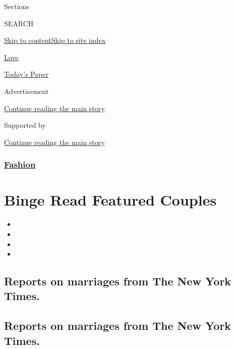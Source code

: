 Sections

SEARCH

\protect\hyperlink{site-content}{Skip to
content}\protect\hyperlink{site-index}{Skip to site index}

\href{https://www.nytimes.com/spotlight/wedding-announcements}{Love}

\href{https://myaccount.nytimes.com/auth/login?response_type=cookie\&client_id=vi}{}

\href{https://www.nytimes.com/section/todayspaper}{Today's Paper}

Advertisement

\protect\hyperlink{after-top}{Continue reading the main story}

Supported by

\protect\hyperlink{after-sponsor}{Continue reading the main story}

\hypertarget{fashion}{%
\subsubsection{\texorpdfstring{\href{/section/fashion}{Fashion}}{Fashion}}\label{fashion}}

\hypertarget{binge-read-featured-couples}{%
\section{Binge Read Featured
Couples}\label{binge-read-featured-couples}}

\begin{itemize}
\item
\item
\item
\item
\end{itemize}

\hypertarget{reports-on-marriages-from-the-new-york-times}{%
\subsection{Reports on marriages from The New York
Times.}\label{reports-on-marriages-from-the-new-york-times}}

\hypertarget{reports-on-marriages-from-the-new-york-times-1}{%
\subsection{Reports on marriages from The New York
Times.}\label{reports-on-marriages-from-the-new-york-times-1}}

